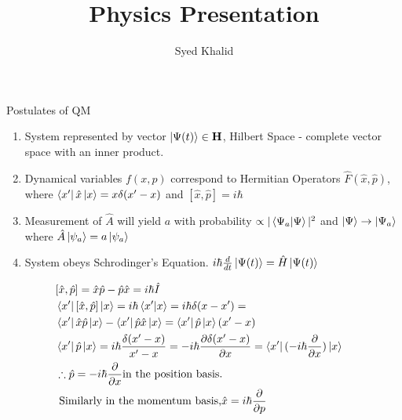 \documentclass[pdf]{beamer}
\title{Physics Presentation}
\author{Syed Khalid}
\begin{document}
\begin{frame}
  \titlepage  
\end{frame}
    
\begin{frame}{Postulates of QM}
  
\begin{enumerate}
  \item System represented by vector $\ket{\Psi(t)} \in \text{\textbf{H}} $, Hilbert Space - complete vector space with an inner product.
  \item Dynamical variables $f(x,p)$ correspond to Hermitian Operators $\hat{F}(\hat{x},\hat{p})$, where $\bra{x'} \hat{x} \ket{x} = x \delta(x'-x)$ and $ [\hat{x},\hat{p}] = i\hbar $ 
  \item Measurement of $ \hat{A} $ will yield $ a $ with probability $ \propto   | \bra{\Psi_{a}  } \ket{\Psi} |^{2}   $ and $ \ket{\Psi} \rightarrow \ket{\Psi_{a}  }  $ where $ \hat{A}\ket{\psi_{a}} = a \ket{ \psi_{a}  } $
  \item System obeys Schrodinger's Equation. $i\hbar\frac{d}{dt}\ket{\Psi(t)} = \hat{H}\ket{\Psi(t)}  $
\end{enumerate} 
\end{frame}

\begin{frame}
\begin{align*}
& [\hat{x},\hat{p}] = \hat{x} \hat{p} - \hat{p} \hat{x} =i \hbar \hat{I} \\   
& \bra{x'} [\hat{x},\hat{p}]  \ket{x} = i\hbar\bra{x'}\ket{x} = i\hbar \delta(x-x') =\\
& \bra{x'} \hat{x} \hat{p} \ket{x} - \bra{x'} \hat{p} \hat{x} \ket{x} = \bra{x'} \hat{p} \ket{x} (x'-x) \\
& \bra{x'} \hat{p} \ket{x} = i\hbar \frac{\delta(x'-x)}{x'-x} = -i\hbar \pdv{\delta(x'-x)}{x} = \bra{x'} (-i\hbar \pdv{x}  ) \ket{x} \\
& \therefore \hat{p} = -i\hbar \pdv{x} \text{in the position basis.}  \\
& \text{ Similarly in the momentum basis,}\hat{x}= i\hbar \pdv{p}
& 
\end{align*}

\end{frame}
\end{document}
